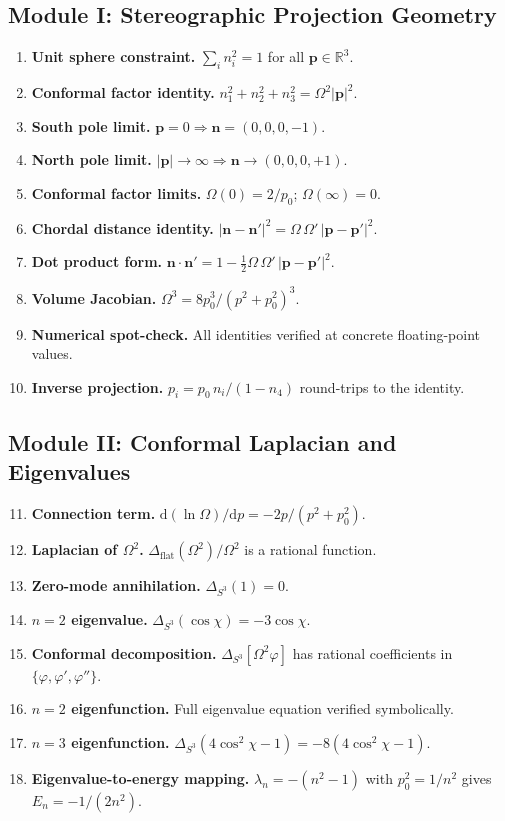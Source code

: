 \documentclass[aps,pra,twocolumn,superscriptaddress,longbibliography]{revtex4-2}
\begin{document}
\subsection{Module I: Stereographic Projection Geometry}

\begin{enumerate}
\item \textbf{Unit sphere constraint.} $\sum_i n_i^2 = 1$ for all $\mathbf{p} \in \mathbb{R}^3$.
\item \textbf{Conformal factor identity.} $n_1^2 + n_2^2 + n_3^2 = \Omega^2 |\mathbf{p}|^2$.
\item \textbf{South pole limit.} $\mathbf{p} = 0 \Rightarrow \mathbf{n} = (0,0,0,-1)$.
\item \textbf{North pole limit.} $|\mathbf{p}| \to \infty \Rightarrow \mathbf{n} \to (0,0,0,+1)$.
\item \textbf{Conformal factor limits.} $\Omega(0) = 2/p_0$; $\Omega(\infty) = 0$.
\item \textbf{Chordal distance identity.} $|\mathbf{n} - \mathbf{n}'|^2 = \Omega\,\Omega'\,|\mathbf{p} - \mathbf{p}'|^2$.
\item \textbf{Dot product form.} $\mathbf{n} \cdot \mathbf{n}' = 1 - \tfrac{1}{2}\Omega\,\Omega'\,|\mathbf{p} - \mathbf{p}'|^2$.
\item \textbf{Volume Jacobian.} $\Omega^3 = 8p_0^3/(p^2 + p_0^2)^3$.
\item \textbf{Numerical spot-check.} All identities verified at concrete floating-point values.
\item \textbf{Inverse projection.} $p_i = p_0\, n_i/(1 - n_4)$ round-trips to the identity.
\end{enumerate}

\subsection{Module II: Conformal Laplacian and Eigenvalues}

\begin{enumerate}\setcounter{enumi}{10}
\item \textbf{Connection term.} $\mathrm{d}(\ln\Omega)/\mathrm{d}p = -2p/(p^2 + p_0^2)$.
\item \textbf{Laplacian of $\Omega^2$.} $\Delta_{\text{flat}}(\Omega^2)/\Omega^2$ is a rational function.
\item \textbf{Zero-mode annihilation.} $\Delta_{S^3}(1) = 0$.
\item \textbf{$n=2$ eigenvalue.} $\Delta_{S^3}(\cos\chi) = -3\cos\chi$.
\item \textbf{Conformal decomposition.} $\Delta_{S^3}[\Omega^2 \varphi]$ has rational coefficients in $\{\varphi, \varphi', \varphi''\}$.
\item \textbf{$n=2$ eigenfunction.} Full eigenvalue equation verified symbolically.
\item \textbf{$n=3$ eigenfunction.} $\Delta_{S^3}(4\cos^2\chi - 1) = -8(4\cos^2\chi - 1)$.
\item \textbf{Eigenvalue-to-energy mapping.} $\lambda_n = -(n^2-1)$ with $p_0^2 = 1/n^2$ gives $E_n = -1/(2n^2)$.
\end{enumerate}
\end{document}
